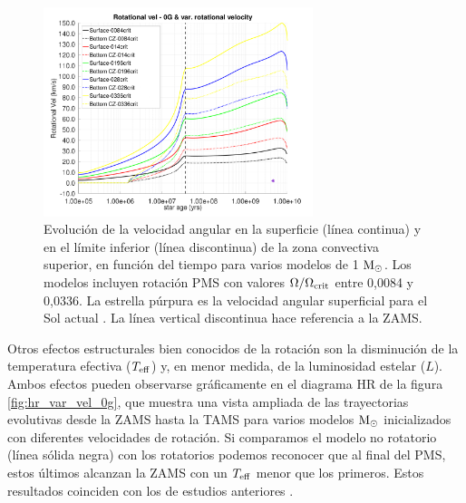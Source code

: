 \begin{figure}
	\centering
	\includegraphics[width=0.7\textwidth]{img/paper1/rot_vel_var_vel_0_0g.pdf}
	\caption{Evolución de la velocidad angular en la superficie (línea continua) y en el límite inferior (línea discontinua) de la zona convectiva superior, en función del tiempo para varios modelos de 1 $\mathrm{M}_\odot$. Los modelos incluyen rotación PMS con valores $\Omega / \Omega_{\mathrm{crit}}$ entre 0,0084 y 0,0336. La estrella púrpura es la velocidad angular superficial para el Sol actual \cite{Gill2012}. La línea vertical discontinua hace referencia a la ZAMS.}
	\label{fig:rot_vel_0g}
\end{figure}

Otros efectos estructurales bien conocidos de la rotación son la disminución de la temperatura efectiva ($T_{\mathrm{eff}}$) y, en menor medida, de la luminosidad estelar ($L$). Ambos efectos pueden observarse gráficamente en el diagrama HR de la figura \ref{fig:hr_var_vel_0g}, que muestra una vista ampliada de las trayectorias evolutivas desde la ZAMS hasta la TAMS para varios modelos $\mathrm{M}_\odot$ inicializados con diferentes velocidades de rotación. Si comparamos el modelo no rotatorio (línea sólida negra) con los rotatorios podemos reconocer que al final del PMS, estos últimos alcanzan la ZAMS con un $T_{\mathrm{eff}}$ menor que los primeros. Estos resultados coinciden con los de estudios anteriores \cite[véase por ejemplo ][]{Eggenberger2012,Piau2001,Pinsonneault1989}.\par

